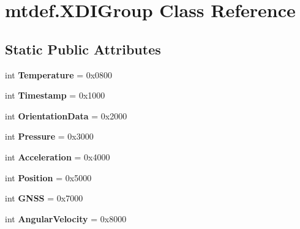 \hypertarget{classmtdef_1_1XDIGroup}{}\section{mtdef.\+X\+D\+I\+Group Class Reference}
\label{classmtdef_1_1XDIGroup}
\subsection*{Static Public Attributes}
\begin{DoxyCompactItemize}
\item 
\mbox{\label{classmtdef_1_1XDIGroup_ab075ee87f9da35d139fd005b16f4cc55}} 
int {\bfseries Temperature} = 0x0800
\item 
\mbox{\label{classmtdef_1_1XDIGroup_a8636f0e8af1fac9a56f6419441c7899c}} 
int {\bfseries Timestamp} = 0x1000
\item 
\mbox{\label{classmtdef_1_1XDIGroup_aefecfd212890ab547e02db7d5d9b2afe}} 
int {\bfseries Orientation\+Data} = 0x2000
\item 
\mbox{\label{classmtdef_1_1XDIGroup_a9fffbc3092093d0a72197541e4cc910a}} 
int {\bfseries Pressure} = 0x3000
\item 
\mbox{\label{classmtdef_1_1XDIGroup_a58616b5ec51c9da3465d164b3a3697e3}} 
int {\bfseries Acceleration} = 0x4000
\item 
\mbox{\label{classmtdef_1_1XDIGroup_a695563e33a4a1ec37dfb185de3350221}} 
int {\bfseries Position} = 0x5000
\item 
\mbox{\label{classmtdef_1_1XDIGroup_af79ce65a0d2d35bd7b1bc6d5c2e8842c}} 
int {\bfseries G\+N\+SS} = 0x7000
\item 
\mbox{\label{classmtdef_1_1XDIGroup_a438ee03d215fa3b16c943d1f3d6daae3}} 
int {\bfseries Angular\+Velocity} = 0x8000
\item 
\mbox{\label{classmtdef_1_1XDIGroup_ad738a717cad4a9fa8dd3d1c863b0ae13}} 

\end{DoxyCompactItemize}

